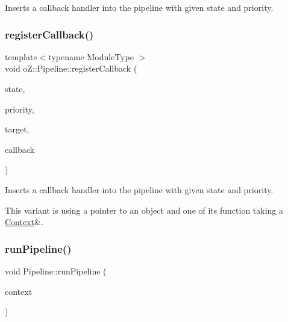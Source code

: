 Inserts a callback handler into the pipeline with given state and priority. 

\mbox{\label{classo_z_1_1_pipeline_af6d96b2697aa6770a3f1dd205b12c1c3}} 
\subsubsection{\texorpdfstring{registerCallback()}{registerCallback()}\hspace{0.1cm}{\footnotesize\ttfamily [2/2]}}
{\footnotesize\ttfamily template$<$typename Module\+Type $>$ \\
void o\+Z\+::\+Pipeline\+::register\+Callback (\begin{DoxyParamCaption}\item[{\mbox{\hyperlink{namespaceo_z_a356b278f7c65def0cae75fca8cae268e}{State}}}]{state,  }\item[{\mbox{\hyperlink{namespaceo_z_af05a92eb185d18369e9b4acdcd9dcd12}{Priority}}}]{priority,  }\item[{Module\+Type $\ast$}]{target,  }\item[{bool(Module\+Type\+::$\ast$)(\mbox{\hyperlink{classo_z_1_1_context}{Context}} \&)}]{callback }\end{DoxyParamCaption})}



Inserts a callback handler into the pipeline with given state and priority. 

This variant is using a pointer to an object and one of its function taking a \mbox{\hyperlink{classo_z_1_1_context}{Context}}\&. \mbox{\label{classo_z_1_1_pipeline_a90bddc5511acce66f2aa780c3bba29b4}} 
\subsubsection{\texorpdfstring{runPipeline()}{runPipeline()}}
{\footnotesize\ttfamily void Pipeline\+::run\+Pipeline (\begin{DoxyParamCaption}\item[{\mbox{\hyperlink{classo_z_1_1_context}{Context}} \&}]{context }\end{DoxyParamCaption})}



